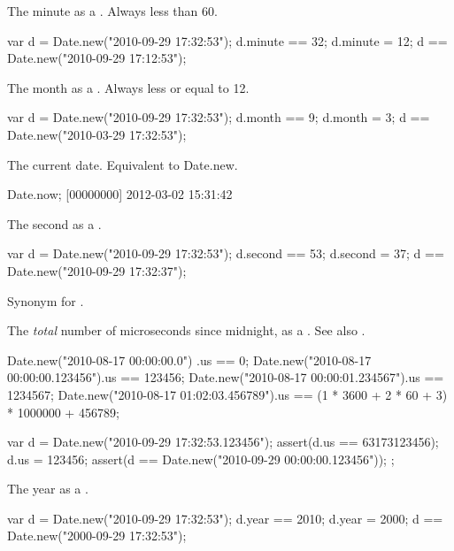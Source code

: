 \begin{urbiscriptapi}
\item[minute]
  The minute as a .  Always less than 60.
\begin{urbiassert}
var d = Date.new("2010-09-29 17:32:53");
d.minute == 32;
d.minute = 12;
d == Date.new("2010-09-29 17:12:53");
\end{urbiassert}


\item[month]
  The month as a .  Always less or equal to 12.
\begin{urbiassert}
var d = Date.new("2010-09-29 17:32:53");
d.month == 9;
d.month = 3;
d == Date.new("2010-03-29 17:32:53");
\end{urbiassert}


\item[now] The current date. Equivalent to Date.new.
\begin{urbiunchecked}
Date.now;
[00000000] 2012-03-02 15:31:42
\end{urbiunchecked}


\item[second]
  The second as a .
\begin{urbiassert}
var d = Date.new("2010-09-29 17:32:53");
d.second == 53;
d.second = 37;
d == Date.new("2010-09-29 17:32:37");
\end{urbiassert}


\item[timestamp] Synonym for .

\item[us]%
  The \emph{total} number of microseconds since midnight, as a
  .  See also .
\begin{urbiassert}
Date.new("2010-08-17 00:00:00.0")     .us == 0;
Date.new("2010-08-17 00:00:00.123456").us == 123456;
Date.new("2010-08-17 00:00:01.234567").us == 1234567;
Date.new("2010-08-17 01:02:03.456789").us
  == (1 * 3600 + 2 * 60 + 3) * 1000000 + 456789;
\end{urbiassert}

\begin{urbiscript}
{
  var d = Date.new("2010-09-29 17:32:53.123456");
  assert(d.us == 63173123456);
  d.us = 123456;
  assert(d == Date.new("2010-09-29 00:00:00.123456"));
};
\end{urbiscript}

\item[year]
  The year as a .
\begin{urbiassert}
var d = Date.new("2010-09-29 17:32:53");
d.year == 2010;
d.year = 2000;
d == Date.new("2000-09-29 17:32:53");
\end{urbiassert}
\end{urbiscriptapi}


